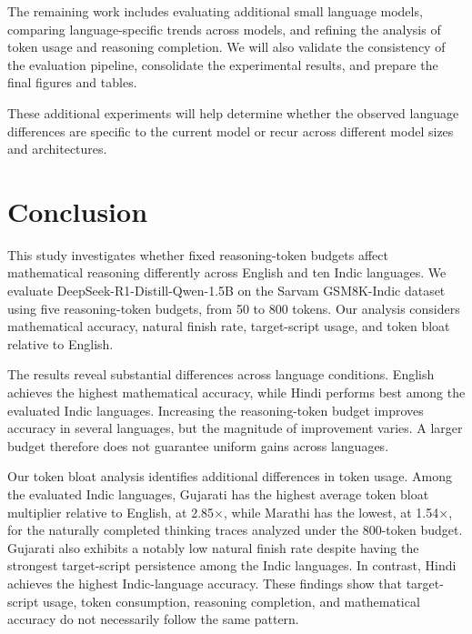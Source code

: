 \documentclass[11pt]{article}
\begin{document}
The remaining work includes evaluating additional small language models, comparing language-specific trends across models, and refining the analysis of token usage and reasoning completion. We will also validate the consistency of the evaluation pipeline, consolidate the experimental results, and prepare the final figures and tables.

These additional experiments will help determine whether the observed language differences are specific to the current model or recur across different model sizes and architectures.


\section{Conclusion}

This study investigates whether fixed reasoning-token budgets affect mathematical reasoning differently across English and ten Indic languages. We evaluate DeepSeek-R1-Distill-Qwen-1.5B on the Sarvam GSM8K-Indic dataset using five reasoning-token budgets, from 50 to 800 tokens. Our analysis considers mathematical accuracy, natural finish rate, target-script usage, and token bloat relative to English.

The results reveal substantial differences across language conditions. English achieves the highest mathematical accuracy, while Hindi performs best among the evaluated Indic languages. Increasing the reasoning-token budget improves accuracy in several languages, but the magnitude of improvement varies. A larger budget therefore does not guarantee uniform gains across languages.

Our token bloat analysis identifies additional differences in token usage. Among the evaluated Indic languages, Gujarati has the highest average token bloat multiplier relative to English, at 2.85$\times$, while Marathi has the lowest, at 1.54$\times$, for the naturally completed thinking traces analyzed under the 800-token budget. Gujarati also exhibits a notably low natural finish rate despite having the strongest target-script persistence among the Indic languages. In contrast, Hindi achieves the highest Indic-language accuracy. These findings show that target-script usage, token consumption, reasoning completion, and mathematical accuracy do not necessarily follow the same pattern.
\end{document}
